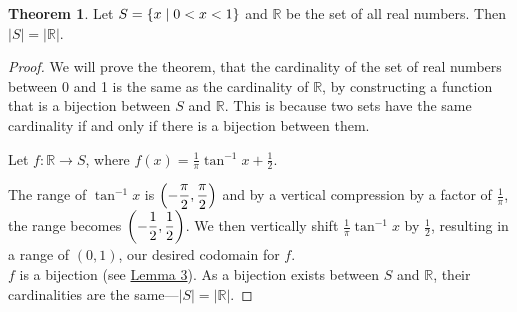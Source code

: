 \documentclass[article, 12pt]{article}
\theoremstyle{definition}
\newtheorem{theorem}{Theorem}
\DeclarePairedDelimiter\paren{(}{)} %
\newcommand{\df}{\displaystyle\frac} %
\DeclarePairedDelimiter\set{\{}{\}}
\newcommand{\reals}{\mathbb{R}} %
\begin{document}
        \begin{theorem}
            Let $S = \set*{x \mid 0 < x < 1}$ and $\reals$ be the set of all real numbers. Then $|S| = |\reals|$.
            \label{thm:cardinality}
        \end{theorem}
        \begin{proof}
            We will prove the theorem, that the cardinality of the set of real numbers between 0 and 1 is the same as the cardinality of $\reals$, by constructing a function that is a bijection between $S$ and $\reals$. This is because two sets have the same cardinality if and only if there is a bijection between them. 

            Let $f: \reals \to S$, where $f(x) = \df{1}{\pi}\tan^{-1}x + \df{1}{2}$. 
        
            The range of $\tan^{-1}x$ is $\paren*{-\df{\pi}{2}, \df{\pi}{2}}$ and by a vertical compression by a factor of $\df{1}{\pi}$, the range becomes $\paren*{-\df{1}{2}, \df{1}{2}}$. We then vertically shift $\df{1}{\pi} \tan^{-1}x$ by $\df{1}{2}$, resulting in a range of $(0, 1)$, our desired codomain for $f$.
            \\[12pt]
            $f$ is a bijection (see \hyperref[lemma:bijection]{Lemma 3}). As a bijection exists between $S$ and $\reals$, their cardinalities are the same---$|S| = |\reals|$.
        \end{proof}
\end{document}
